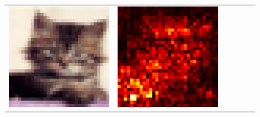 \documentclass[preprint,12pt]{elsarticle}
\begin{document}
\begin{figure}[p]
\begin{tabular}{cccccc}
  \includegraphics[scale=\scale]{../visualizations/examples/cifar10/cnn/images/3.png} &
  \includegraphics[scale=\scale]{../visualizations/examples/cifar10/cnn/saliency_map/3.png} & 

\end{tabular}
\end{figure}
\end{document}
